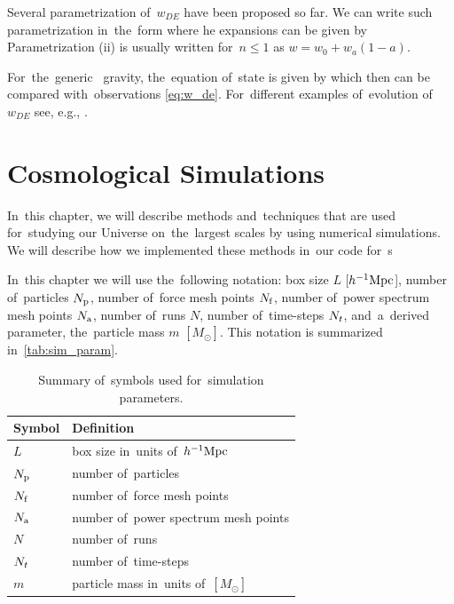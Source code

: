 Several parametrization  of~\(w_{DE}\) have been proposed so far. We can write such parametrization  in~the~form
where he expansions can be given by
Parametrization (ii) is usually written for~\(n\leq1\) as \(w=w_0+w_a(1-a)\).

For~the~generic \fR\ gravity, the~equation of~state is given by \parencite{2013qopu.conf...73B}
which then can be compared with~observations \eqref{eq:w_de}. For~different examples of~evolution of~$w_{DE}$ see, e.g., \textcite{2020arXiv200707717A}. \clearpage{}
\clearpage{}\chapter{Cosmological Simulations}
\label{chpt:cosmo_sim}
In~this chapter, we will describe methods and~techniques that are used for~studying our Universe on~the~largest scales by using numerical simulations. We will describe how we implemented these methods in~our code for~\nbodysim s\DIFdelbegin \DIFdel{/
}\DIFdelend \DIFaddbegin {}\DIFaddend 

In~this chapter we will use the~following notation: box size $L$ [$h^{-1}\text{Mpc}$], number of~particles $N_{\rm p}$, number of~force mesh points $N_{\rm f}$, number of~power spectrum mesh points $N_{\rm a}$, number of~runs $N$, number of~time-steps $N_t$, and~a~derived parameter, the~particle mass $m$ $[M_\odot]$. This notation is summarized in~\autoref{tab:sim_param}.

\begin{table}
\centering
\begin{tabular}{ll}
    \hline \hline
    Symbol & Definition \\
    \hline
    $L$ & box size in~units of~$h^{-1}\text{Mpc}$ \\
    $N_{\rm p}$ & number of~particles \\
    $N_{\rm f}$ & number of~force mesh points \\
    $N_{\rm a}$ & number of~power spectrum mesh points \\
    $N$ & number of~runs \\
    $N_t$ & number of~time-steps \\
    $m$ & particle mass in~units of~$[M_\odot]$ \\
    \hline \hline
\end{tabular}
\caption{Summary of~symbols used for~simulation parameters.}
\label{tab:sim_param}
\end{table}


